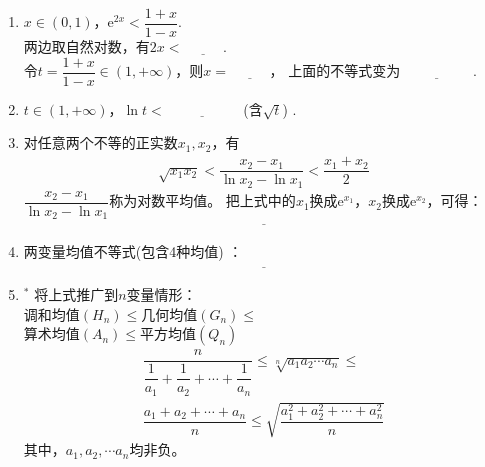 \documentclass{article}
\newif\ifte
\newcommand{\e}{\mathrm{e}}
\renewcommand\leq\leqslant
\begin{document}
\begin{multicols}{2}
\begin{enumerate}[leftmargin=20pt]
\item $ x\in (0,1) $，$ \e^{2x}<\dfrac{1+x}{1-x} $. \\
两边取自然对数，有$ 2x<\underline{\ \ifte 
    \ln\dfrac{1+x}{1-x} \else \hspace{1cm} \fi\ } $. \\
令$ t=\dfrac{1+x}{1-x}\in(1,+\infty) $，则$ x=\underline{\ \ifte 
    \dfrac{t-1}{t+1}\else \hspace{1cm} \fi\ } $，
上面的不等式变为$ \underline{\ \ifte \dfrac{2(t-1)}{t+1}<\ln t
    \else \hspace{2cm} \fi\ } $.

\item $ t\in(1,+\infty) $，$ \ln t<\underline{\ \ifte 
    \sqrt{t}-\dfrac{1}{\sqrt{t}} \else \hspace{2cm} \fi\ } $
\ifte \else (含$ \sqrt{t} $) \fi.

\item 对任意两个不等的正实数$ x_1,x_2 $，有
\begin{align*}
    \sqrt{x_1x_2}<\dfrac{x_2-x_1}{\ln x_2-\ln x_1}<\dfrac{x_1+x_2}{2}
\end{align*}
$ \dfrac{x_2-x_1}{\ln x_2-\ln x_1} $称为对数平均值。
把上式中的$ x_1 $换成$ \e^{x_1} $，$ x_2 $换成$ \e^{x_2} $，可得：
\begin{align*}
    \underline{\ \ifte\e^{\frac{x_1+x_2}{2}}<\dfrac{\e^{x_2}
    -\e^{x_1}}{x_2-x_1}<\dfrac{\e^{x_1}+\e^{x_2}}{2}
    \else \hspace{7cm} \fi\ }
\end{align*}

\item 两变量均值不等式\ifte \else (包含4种均值) \fi：
\begin{align*}
    \underline{\ \ifte \dfrac{2}{\dfrac{1}{a}+\dfrac{1}{b}}\leq 
    \sqrt{ab} \leq \dfrac{a+b}{2}
    \leq \sqrt{\dfrac{a^2+b^2}{2}}\else \hspace{7cm} \fi\ }
\end{align*}

\item $^*$ 将上式推广到$ n $变量情形：\\
调和均值$(H_n) \leq $几何均值$(G_n) \leq $ \\
算术均值$(A_n) \leq $平方均值$ (Q_n) $
\begin{gather*}
    \dfrac{n}{\dfrac{1}{a_1}+\dfrac{1}{a_2}+\cdots +\dfrac{1}{a_n}}\leq 
    \sqrt[n]{a_1a_2\cdots a_n} \leq \\ \dfrac{a_1+a_2+\cdots +a_n}{n} \leq 
    \sqrt{\dfrac{a_1^2+a_2^2+\cdots +a_n^2}{n}}
\end{gather*}
其中，$ a_1,a_2,\cdots a_n $均非负。


\end{enumerate}
\end{multicols}
\end{document}

